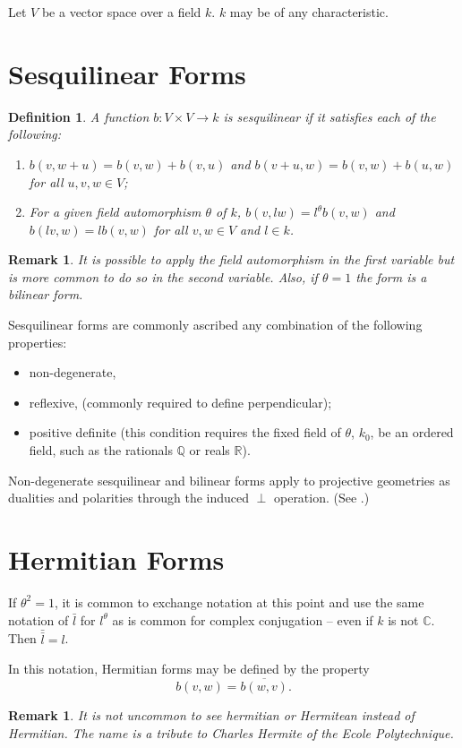 \documentclass[12pt]{article}
\newtheorem{defn}[thm]{Definition}
\newtheorem{remark}[thm]{Remark}
\begin{document}
Let $V$ be a vector space over a field $k$.  $k$ may be of any characteristic.

\section{Sesquilinear Forms}

\begin{defn}
A function $b:V\times V\rightarrow k$ is sesquilinear if it satisfies each of
the following:
\begin{enumerate}
\item $b(v,w+u)=b(v,w)+b(v,u)$ and $b(v+u,w)=b(v,w)+b(u,w)$ for all $u,v,w\in V$;
\item For a given field automorphism $\theta$ of $k$, $b(v,lw)=l^\theta b(v,w)$ and $b(lv,w)=lb(v,w)$ for all $v,w\in V$ and $l\in k$.
\end{enumerate}
\end{defn}

\begin{remark}
It is possible to apply the field automorphism in the first variable but is more common to do so in the second variable.  Also, if $\theta=1$ the form is a bilinear form.  
\end{remark}

Sesquilinear forms are commonly ascribed any combination of the following properties:
\begin{itemize}
\item non-degenerate,
\item reflexive, (commonly required to define perpendicular);
\item positive definite (this condition requires the fixed field of $\theta$,
$k_0$, be an ordered field, such as the rationals $\mathbb{Q}$ or reals $\mathbb{R}$).
\end{itemize}

Non-degenerate sesquilinear and bilinear forms apply to projective geometries as dualities and polarities through the induced $\perp$ operation.  (See .)

\section{Hermitian Forms}

If $\theta^2=1$, it is common to exchange notation at this point and use the same notation of $\bar{l}$ for $l^\theta$ as is common for complex conjugation -- even if $k$ is not $\mathbb{C}$.  Then $\bar{\bar{l}}=l$.

In this notation, Hermitian forms may be defined by the property
\[b(v,w)=\overline{b(w,v)}.\]

\begin{remark}
It is not uncommon to see hermitian or Hermitean instead of Hermitian.  The name is a tribute to Charles Hermite of the Ecole Polytechnique.
\end{remark}


\end{document}
